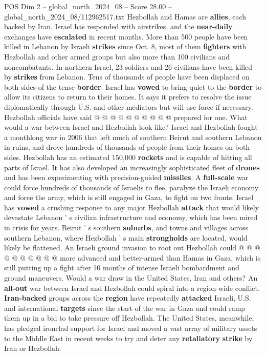 \begin{textsample}{POS Dim 2 – global\_north\_2024\_08 – Score 28.00 – global\_north\_2024\_08/112962517.txt}
Hezbollah and Hamas are \textbf{allies}, each backed by Iran.
Israel has responded with airstrikes, and the \textbf{near-daily} exchanges have \textbf{escalated} in recent months.
More than 500 people have been killed in Lebanon by Israeli \textbf{strikes} since Oct. 8, most of them \textbf{fighters} with Hezbollah and other armed groups but also more than 100 civilians and noncombatants.
In northern Israel, 23 soldiers and 26 civilians have been killed by \textbf{strikes} from Lebanon.
Tens of thousands of people have been displaced on both sides of the tense \textbf{border}.
Israel has \textbf{vowed} to bring quiet to the \textbf{border} to allow its citizens to return to their homes.
It says it prefers to resolve the issue diplomatically through U.S. and other mediators but will use force if necessary.
Hezbollah officials have said @ @ @ @ @ @ @ @ @ @ prepared for one.
What would a war between Israel and Hezbollah look like?
Israel and Hezbollah fought a monthlong war in 2006 that left much of southern Beirut and southern Lebanon in ruins, and drove hundreds of thousands of people from their homes on both sides.
Hezbollah has an estimated 150,000 \textbf{rockets} and is capable of hitting all parts of Israel.
It has also developed an increasingly sophisticated fleet of \textbf{drones} and has been experimenting with precision-guided \textbf{missiles}.
A \textbf{full-scale} war could force hundreds of thousands of Israelis to flee, paralyze the Israeli economy and force the army, which is still engaged in Gaza, to fight on two fronts.
Israel has \textbf{vowed} a crushing response to any major Hezbollah \textbf{attack} that would likely devastate Lebanon ' s civilian infrastructure and economy, which has been mired in crisis for years.
Beirut ' s southern \textbf{suburbs}, and towns and villages across southern Lebanon, where Hezbollah ' s main \textbf{strongholds} are located, would likely be flattened.
An Israeli ground invasion to root out Hezbollah could @ @ @ @ @ @ @ @ @ @ more advanced and better-armed than Hamas in Gaza, which is still putting up a fight after 10 months of intense Israeli bombardment and ground maneuvers.
Would a war draw in the United States, Iran and others?
An \textbf{all-out} war between Israel and Hezbollah could spiral into a region-wide conflict. \textbf{Iran-backed} groups across the \textbf{region} have repeatedly \textbf{attacked} Israeli, U.S. and international \textbf{targets} since the start of the war in Gaza and could ramp them up in a bid to take pressure off Hezbollah.
The United States, meanwhile, has pledged ironclad support for Israel and moved a vast array of military assets to the Middle East in recent weeks to try and deter any \textbf{retaliatory} \textbf{strike} by Iran or Hezbollah.

\end{textsample}
